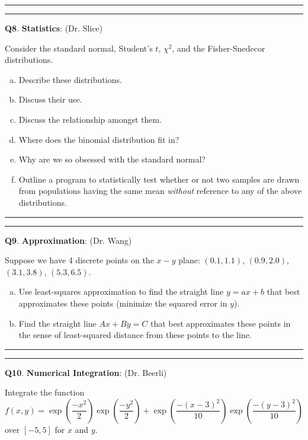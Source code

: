 \documentclass[11pt,letterpaper]{article}
\newcommand{\highlight}[1]{\textcolor{BrickRed}{#1}}
\begin{document}
\bigskip
\hrule \medskip

\pagebreak

\pagebreak
\hrule 
\medskip
\textbf{Q8}. \highlight{\textbf{Statistics}}: (Dr. Slice)
\label{q8}
\bigskip

Consider the standard normal, Student's $t$, $\chi^2$, and the Fisher-Snedecor distributions.

\begin{enumerate}[a)]
\item Describe these distributions.
\item Discuss their use.
\item Discuss the relationship amongst them.
\item Where does the binomial distribution fit in?
\item Why are we so obsessed with the standard normal?
\item Outline a program to statistically test whether or not two samples are drawn from populations having the same mean \textit{without} reference to any of the above distributions.
\end{enumerate}


\bigskip
\hrule \medskip

\pagebreak

\pagebreak
\hrule 
\medskip
\textbf{Q9}. \highlight{\textbf{Approximation}}: (Dr. Wang)

\bigskip


Suppose we have 4 discrete points on the $x-y$ plane: $(0.1, 1.1)$, $(0.9, 2.0)$, $(3.1, 3.8)$, $(5.3, 6.5)$. 

\begin{enumerate}[a)]
\item Use least-squares approximation to find the straight line $y = ax + b$ that best approximates these points (minimize the squared error in $y$).

\item Find the straight line $Ax + By = C$ that best approximates these points in the sense of least-squared distance from these points to the line.
\end{enumerate}

\bigskip
\hrule \medskip

\pagebreak

\pagebreak
\hrule 
\medskip
\textbf{Q10}. \highlight{\textbf{Numerical Integration}}: (Dr. Beerli)

\bigskip

Integrate the function
$$
f(x,y) = \exp\left({\frac{-x^2}{2}}\right) \exp\left({\frac{-y^2}{2}}\right) + \exp{\left(\frac{-(x-3)^2}{10}\right)} \exp{\left(\frac{-(y-3)^2}{10}\right)}
$$
over $[-5,5]$ for $x$ and $y$.  
\end{document}
